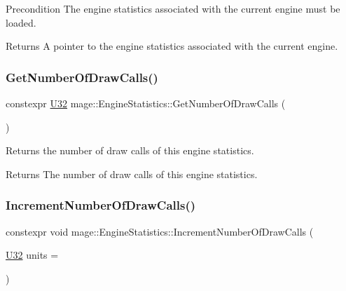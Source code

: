 \begin{DoxyPrecond}{Precondition}
The engine statistics associated with the current engine must be loaded. 
\end{DoxyPrecond}
\begin{DoxyReturn}{Returns}
A pointer to the engine statistics associated with the current engine. 
\end{DoxyReturn}
\hypertarget{classmage_1_1_engine_statistics_a8c9a6691cec0c6544c4fb2e426ab4379}{}\label{classmage_1_1_engine_statistics_a8c9a6691cec0c6544c4fb2e426ab4379} 
\subsubsection{\texorpdfstring{Get\+Number\+Of\+Draw\+Calls()}{GetNumberOfDrawCalls()}}
{\footnotesize\ttfamily constexpr \hyperlink{namespacemage_a41c104c036fba3756a74e19f793eeaa1}{U32} mage\+::\+Engine\+Statistics\+::\+Get\+Number\+Of\+Draw\+Calls (\begin{DoxyParamCaption}{ }\end{DoxyParamCaption})\hspace{0.3cm}{\ttfamily [noexcept]}}

Returns the number of draw calls of this engine statistics.

\begin{DoxyReturn}{Returns}
The number of draw calls of this engine statistics. 
\end{DoxyReturn}
\hypertarget{classmage_1_1_engine_statistics_abd7d06c31fb163cec7938342e75ebc9d}{}\label{classmage_1_1_engine_statistics_abd7d06c31fb163cec7938342e75ebc9d} 
\subsubsection{\texorpdfstring{Increment\+Number\+Of\+Draw\+Calls()}{IncrementNumberOfDrawCalls()}}
{\footnotesize\ttfamily constexpr void mage\+::\+Engine\+Statistics\+::\+Increment\+Number\+Of\+Draw\+Calls (\begin{DoxyParamCaption}\item[{\hyperlink{namespacemage_a41c104c036fba3756a74e19f793eeaa1}{U32}}]{units = {} }\end{DoxyParamCaption})\hspace{0.3cm}{\ttfamily [noexcept]}}

